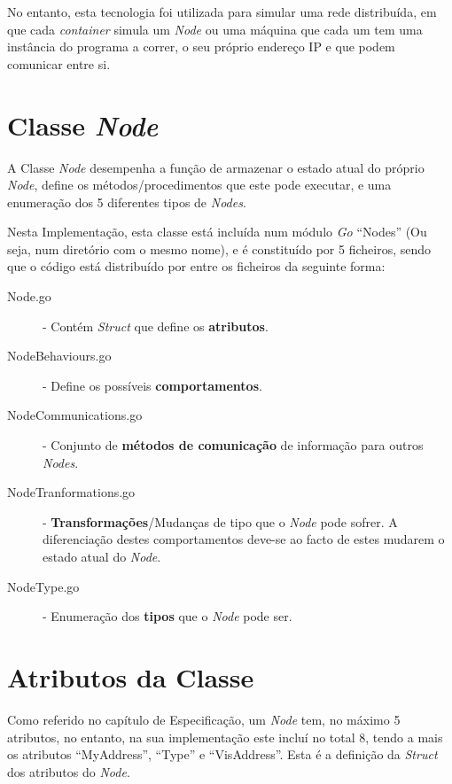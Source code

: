 No entanto, esta tecnologia foi utilizada para simular uma rede distribuída, em que cada \emph{container} simula um \emph{Node} ou uma máquina que cada um tem uma instância do programa a correr, o seu próprio endereço \acs{IP} e que podem comunicar entre si.






\section{Classe \emph{Node}}
A Classe \emph{Node} desempenha a função de armazenar o estado atual do próprio \emph{Node}, define os métodos/procedimentos que este pode executar, e uma enumeração dos 5 diferentes tipos de \emph{Nodes}.



Nesta Implementação, esta classe está incluída num módulo \emph{Go} ``Nodes'' (Ou seja, num diretório com o mesmo nome), e é constituído por 5 ficheiros, sendo que o código está distribuído por entre os ficheiros da seguinte forma:

\begin{description}
    \item [Node.go] - Contém \emph{Struct} que define os \textbf{atributos}.
    \item [NodeBehaviours.go] - Define os possíveis \textbf{comportamentos}.
    \item [NodeCommunications.go] - Conjunto de \textbf{métodos de comunicação} de informação para outros \emph{Nodes}.
    \item [NodeTranformations.go] - \textbf{Transformações}/Mudanças de tipo que o \emph{Node} pode sofrer. A diferenciação destes comportamentos deve-se ao facto de estes mudarem o estado atual do \emph{Node}.
    \item [NodeType.go] - Enumeração dos \textbf{tipos} que o \emph{Node} pode ser.
\end{description} 


\section{Atributos da Classe}
Como referido no capítulo de Especificação, um \emph{Node} tem, no máximo 5 atributos, no entanto, na sua implementação este incluí no total 8, tendo a mais os atributos ``MyAddress'', ``Type'' e ``VisAddress''.
Esta é a definição da \emph{Struct} dos atributos do \emph{Node}.


